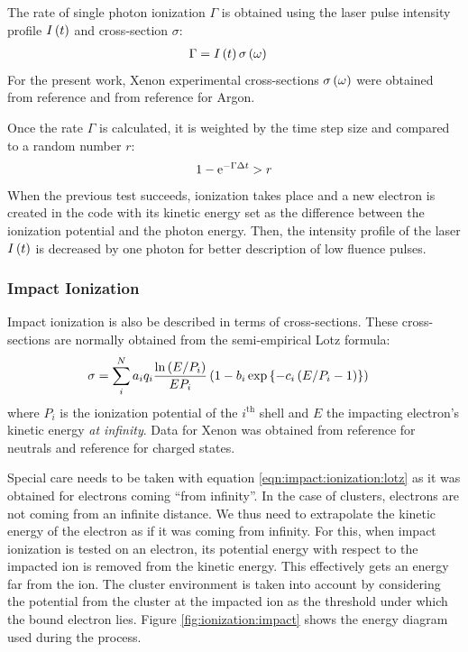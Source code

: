 The rate of single photon ionization $\Gamma$ is obtained using the laser
pulse intensity profile $I\left( t \right)$ and cross-section $\sigma$:
\begin{align}
\Gamma & = I\left( t \right) \sigma\left( \omega \right)
\end{align}
For the present work, Xenon experimental cross-sections $\sigma\left( \omega \right)$
were obtained from reference \cite{West1978} and from reference
\cite{Marr1976} for Argon.

Once the rate $\Gamma$ is calculated, it is weighted\cite{Lax2006} by the time
step size and compared to a random number $r$:
\begin{align}
1 - \textrm{e}^{-\Gamma \Delta t} > r
\end{align}
When the previous test succeeds, ionization takes place and a new electron is
created in the code with its kinetic energy set as the difference between the
ionization potential and the photon energy. Then, the intensity profile of the
laser $I\left( t \right)$ is decreased by one photon for better description of low fluence
pulses.





\subsubsection{Impact Ionization}
Impact ionization is also be described in terms of cross-sections. These
cross-sections are normally obtained from the semi-empirical Lotz
formula\cite{Lotz1967}:
\begin{align}
\sigma & = \sum_{i}^{N} a_i q_i \frac{\ln{\left( E/P_i \right)}}{E P_i} \left( 1 - b_i
\exp{ \left\{ -c_i \left( E/P_i - 1 \right) \right\}} \right)
\label{eqn:impact:ionization:lotz}
\end{align}
where $P_i$ is the ionization potential of the $i^{\textrm{th}}$ shell and $E$
the impacting electron's kinetic energy \textit{at infinity}.
Data for Xenon was obtained from reference \cite{Tawara1987} for neutrals
and reference \cite{Heidenreich2005} for charged states.

Special care needs to be taken with equation \eqref{eqn:impact:ionization:lotz}
as it was obtained for electrons coming ``from infinity''. In the case of
clusters, electrons are not coming from an infinite distance. We thus need to
extrapolate the kinetic energy of the electron as if it was coming from
infinity. For this, when impact ionization is tested on an electron, its
potential energy with respect to the impacted ion is removed from the kinetic
energy. This effectively gets an energy far from the ion. The cluster
environment is taken into account by considering the potential from the cluster
at the impacted ion as the threshold under which the bound electron lies.
Figure \ref{fig:ionization:impact} shows the energy diagram used during the
process.

